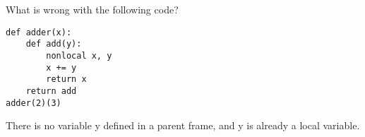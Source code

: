\question What is wrong with the following code?
\begin{lstlisting}
def adder(x):
    def add(y):
        nonlocal x, y
        x += y
        return x
    return add
adder(2)(3)
\end{lstlisting}
\begin{solution}[0.5in]
There is no variable y defined in a parent frame, and y is already a local
variable.
\end{solution}
